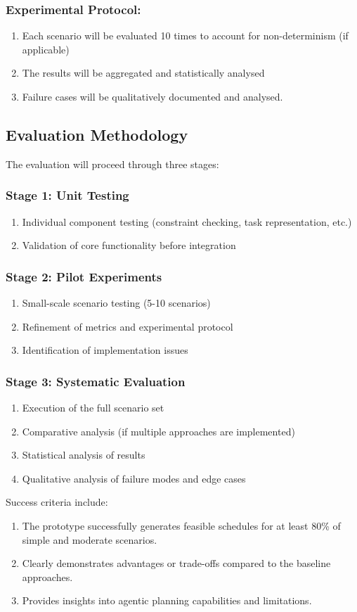 \documentclass[12pt]{article}
\begin{document}
\subsubsection{Experimental Protocol:}
\begin{enumerate}
    \item Each scenario will be evaluated 10 times to account for non-determinism (if applicable)
    \item  The results will be aggregated and statistically analysed
    \item Failure cases will be qualitatively documented and analysed.
\end{enumerate}
\subsection{Evaluation Methodology}

The evaluation will proceed through three stages:

\subsubsection{Stage 1: Unit Testing}
\begin{enumerate}
    \item Individual component testing (constraint checking, task representation, etc.)
    \item Validation of core functionality before integration
\end{enumerate}
\subsubsection{Stage 2: Pilot Experiments}
\begin{enumerate}
    \item Small-scale scenario testing (5-10 scenarios)
    \item Refinement of metrics and experimental protocol
    \item Identification of implementation issues
\end{enumerate}
\subsubsection{Stage 3: Systematic Evaluation}
\begin{enumerate}
    \item Execution of the full scenario set
    \item Comparative analysis (if multiple approaches are implemented)
    \item Statistical analysis of results
    \item Qualitative analysis of failure modes and edge cases
\end{enumerate}
Success criteria include:
\begin{enumerate}
    \item The prototype successfully generates feasible schedules for at least 80\% of simple and moderate scenarios.
    \item Clearly demonstrates advantages or trade-offs compared to the baseline approaches.
    \item Provides insights into agentic planning capabilities and limitations.
\end{enumerate}
\end{document}
